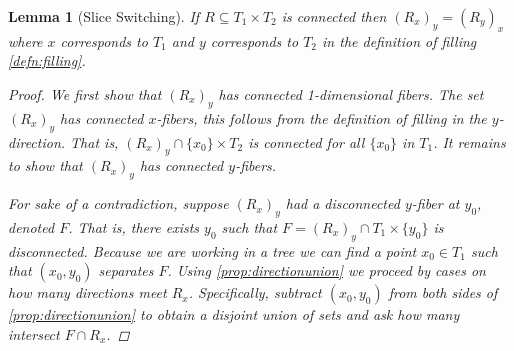 \documentclass[12pt,parskip=full]{report}
\theoremstyle{plain}
\newtheorem{lem}[thm]{Lemma}
\theoremstyle{definition}
\newcommand{\rxy}{(R_x)_y}
\begin{document}
\begin{lem}
    [Slice Switching]
    \label{lem:sliceswitching}
    If \(R \subseteq T_{1} \times T_{2}\) is connected then \( \left( R_{x} \right)_{y} = \left( R_{y} \right)_{x}\) where $x$ corresponds to $T_1$ and $y$ corresponds to $T_2$ in the definition of filling \ref{defn:filling}.
    \begin{proof}
        We first show that $\rxy$ has connected 1-dimensional fibers. The set $\rxy$ has connected $x$-fibers, this follows from the definition of filling in the $y$-direction. That is, $\left( R_{x} \right)_{y} \cap \{x_0\} \times T_2$ is connected for all $\{x_0\}$ in $T_1$. It remains to show that \(\rxy\) has connected $y$-fibers.
        
        For sake of a contradiction, suppose \(\rxy\) had a disconnected $y$-fiber at $y_0$, denoted $F$. That is, there exists $y_0$ such that \(F = \left( R_{x} \right)_{y}\cap T_1 \times \{y_0\}\) is disconnected. Because we are working in a tree we can find a point \(x_0\in T_1\)  such that \((x_0,y_0)\)  separates \(F\). Using \ref{prop:directionunion} we proceed by cases on how many directions meet $R_x$. Specifically, subtract \((x_0,y_0)\) from both sides of \ref{prop:directionunion} to obtain a disjoint union of sets and ask how many intersect $F \cap R_x$.
        

\end{proof}
\end{lem}
\end{document}
